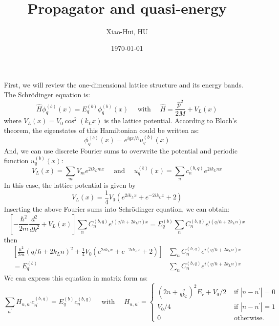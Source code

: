 \documentclass{article}
\title{Propagator and quasi-energy}
\author{Xiao-Hui, HU}
\date{\today}
\begin{document}
    \maketitle
    First, we will review the one-dimensional lattice structure and its energy bands.
    The Schrödinger equation is:
    \begin{equation}
        \hat{H} \phi_{q}^{(b)}(x)=E_{q}^{(b)} \phi_{q}^{(b)}(x) \quad \text { with } \quad \hat{H}=\frac{\hat{p}^{2}}{2 M}+V_{L}(x)
    \end{equation}
    where $V_{L}(x)=V_{0} \cos ^{2}\left(k_{L} x\right)$ is the lattice potential.
    According to Bloch's theorem, the eigenstates of this Hamiltonian could be written as:
    \begin{equation}
        \phi_{q}^{(b)}(x)=e^{i q x / \hbar} u_{q}^{(b)}(x)
    \end{equation}
    And, we can use discrete Fourier sums to overwrite the potential and periodic function $u_{q}^{(b)}(x)$:
    \begin{equation}
        V_{L}(x)=\sum_{m} V_{m} e^{2 i k_{L} m x} \quad \text { and } \quad u_{q}^{(b)}(x)=\sum_{n} c_{n}^{(b, q)} e^{2 i k_{L} n x}
    \end{equation}
    In this case, the lattice potential is given by 
    \begin{equation}
        V_{L}(x)=\frac{1}{4} V_{0}\left(e^{2 i k_{L} x}+e^{-2 i k_{L} x}+2\right)
    \end{equation}
    Inserting the above Fourier sums into Schrödinger equation, we can obtain:
    \begin{equation}
        \left[-\frac{\hbar^{2}}{2 m} \frac{d^{2}}{dk^{2}}+V_L(x)\right] \sum_{n} C_{n}^{(b,q)} e^{i(q/\hbar + 2k_Ln)x}=E_q^{(b)}  \sum_{n} C_{n}^{(b,q)} e^{i(q/\hbar + 2k_Ln)x}
    \end{equation}
    then
    \begin{equation}
        \begin{aligned}
            \left[\frac{\hbar^{2}}{2 m}(q/\hbar+2k_Ln)^{2}+\frac{1}{4} V_{0}\left(e^{2 i k_{L} x}+e^{-2 i k_{L} x}+2\right)\right] &\sum_{n} C_{n}^{(b,q)} e^{i(q/\hbar + 2k_Ln)x} \\
            =  E_q^{(b)}  &\sum_{n} C_{n}^{(b,q)} e^{i(q/\hbar + 2k_Ln)x}
        \end{aligned}
    \end{equation}
    We can express this equation in matrix form as:
    \begin{equation}
        \sum_{n^{\prime}} H_{n, n^{\prime}} c_{n^{\prime}}^{(b, q)}=E_{q}^{(b)} c_{n}^{(b, q)} \quad \text { with } 
        \quad H_{n, n^{\prime}}=\left\{\begin{array}{ll}{\left(2 n+\frac{q}{\hbar k_{L}}\right)^{2} E_{r}+V_{0} / 2} & {\text { if }\left|n-n^{\prime}\right|=0} 
        \\ {V_{0} / 4} & {\text { if }\left|n-n^{\prime}\right|=1} 
        \\ {0} & {\text { otherwise. }}\end{array}\right.
    \end{equation}
\end{document}

